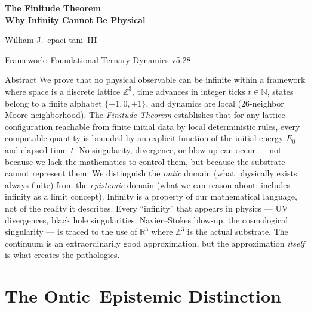 \documentclass[11pt]{article}
\theoremstyle{tight}
\theoremstyle{plainroman}
\newcommand{\R}{\mathbb{R}}
\newcommand{\Z}{\mathbb{Z}}
\newcommand{\N}{\mathbb{N}}
\begin{document}
\begin{titlepage}
\centering
\vspace*{1.8cm}
{\fontsize{22}{27}\selectfont\bfseries\color{accent}
The Finitude Theorem\\[0.35em]
Why Infinity Cannot Be Physical\par}
\vspace{0.8cm}
{\large William J.\ cpaci-tani~III\par}
\vspace{0.3cm}
{\normalsize Framework: Foundational Ternary Dynamics v5.28\par}
\vspace{1.2cm}
\begin{minipage}{0.86\textwidth}
\begin{statusbox}{Abstract}
We prove that no physical observable can be infinite within a framework where space is a discrete lattice $\Z^3$, time advances in integer ticks $t\in\N$, states belong to a finite alphabet $\{-1,0,+1\}$, and dynamics are local (26-neighbor Moore neighborhood).
The \emph{Finitude Theorem} establishes that for any lattice configuration reachable from finite initial data by local deterministic rules, every computable quantity is bounded by an explicit function of the initial energy $E_0$ and elapsed time~$t$.
No singularity, divergence, or blow-up can occur --- not because we lack the mathematics to control them, but because the substrate cannot represent them.
We distinguish the \emph{ontic} domain (what physically exists: always finite) from the \emph{epistemic} domain (what we can reason about: includes infinity as a limit concept).
Infinity is a property of our mathematical language, not of the reality it describes.
Every ``infinity'' that appears in physics --- UV divergences, black hole singularities, Navier--Stokes blow-up, the cosmological singularity --- is traced to the use of $\R^3$ where $\Z^3$ is the actual substrate.
The continuum is an extraordinarily good approximation, but the approximation \emph{itself} is what creates the pathologies.
\end{statusbox}
\end{minipage}
\vfill
\end{titlepage}
\tableofcontents
\thispagestyle{empty}
\clearpage

\section{The Ontic--Epistemic Distinction}
\end{document}
